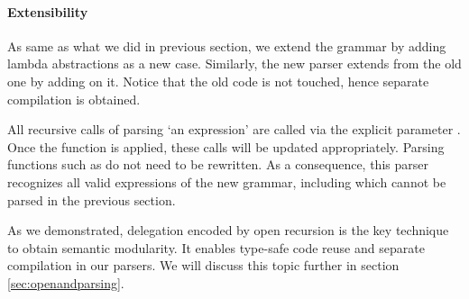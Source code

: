 




\paragraph{Extensibility} As same as what we did in previous section, we extend the grammar by adding lambda abstractions as a new case. Similarly, the new parser extends from the old one by adding  on it. Notice that the old code is not touched, hence separate compilation is obtained.


All recursive calls of parsing `an expression' are called via the explicit parameter . Once the  function is applied, these calls will be updated appropriately. Parsing functions such as  do not need to be rewritten. As a consequence, this parser recognizes all valid expressions of the new grammar, including   which cannot be parsed in the previous section.


As we demonstrated, delegation encoded by open recursion is the key technique to obtain semantic modularity. It enables type-safe code reuse and separate compilation in our parsers. We will discuss this topic further in section \ref{sec:openandparsing}.

